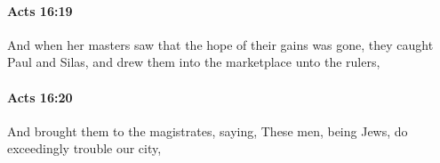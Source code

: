 		\paragraph{Acts 16:19} %
			\label{ACTS-16-19}

			And when her masters saw that the hope of their gains was gone, they caught Paul and Silas, and drew them into the marketplace unto the rulers,

			\begin{framed}
			\scriptsize
				\begin{compactdesc}
					\item[SBLG] 
				\end{compactdesc}
			\end{framed}

		\paragraph{Acts 16:20} %
			\label{ACTS-16-20}

			And brought them to the magistrates, saying, These men, being Jews, do exceedingly trouble our city,

